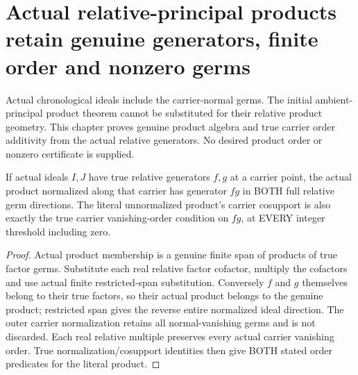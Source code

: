 \section{Actual relative-principal products retain genuine generators, finite order and nonzero germs}

Actual chronological ideals include the carrier-normal germs. The initial
ambient-principal product theorem cannot be substituted for their relative
product geometry. This chapter proves genuine product algebra and true
carrier order additivity from the actual relative generators. No desired
product order or nonzero certificate is supplied.

\begin{lemma}
\label{hir:sharp-actual-relative-product-generator}
\leanok
If actual ideals $I,J$ have true relative generators $f,g$ at a carrier
point, the actual product normalized along that carrier has generator $fg$
in BOTH full relative germ directions. The literal unnormalized product's
carrier cosupport is also exactly the true carrier vanishing-order
condition on $fg$, at EVERY integer threshold including zero.
\end{lemma}
\begin{proof}
Actual product membership is a genuine finite span of products of true
factor germs. Substitute each real relative factor cofactor, multiply the
cofactors and use actual finite restricted-span substitution. Conversely
$f$ and $g$ themselves belong to their true factors, so their actual product
belongs to the genuine product; restricted span gives the reverse entire
normalized ideal direction. The outer carrier normalization retains all
normal-vanishing germs and is not discarded. Each real relative multiple
preserves every actual carrier vanishing order. True normalization/cosupport
identities then give BOTH stated order predicates for the literal product.
\end{proof}

